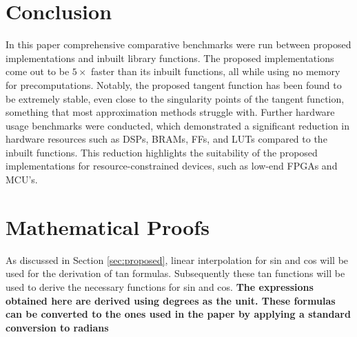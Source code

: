 \documentclass[12pt,twoside, letterpaper, margin=1in]{article}
\begin{document}
\section{Conclusion}
In this paper comprehensive comparative benchmarks were run between proposed implementations and inbuilt library functions. The proposed implementations come out to be \(5 \times\) faster than its inbuilt functions, all while using no memory for precomputations. Notably, the proposed tangent function has been found to be extremely stable, even close to the singularity points of the tangent function, something that most approximation methods struggle with.
Further hardware usage benchmarks were conducted, which demonstrated a significant reduction in hardware resources such as DSPs, BRAMs, FFs, and LUTs compared to the inbuilt functions. This reduction highlights the suitability of the proposed implementations for resource-constrained devices, such as low-end FPGAs and MCU's.








\appendix

\section{Mathematical Proofs}
\label{appendix:proofs}
As discussed in Section \ref{sec:proposed}, linear interpolation for sin and cos will be used for the derivation of tan formulas. Subsequently these tan functions will be used to derive the necessary functions for sin and cos. \textbf{The expressions obtained here are derived using degrees as the unit. These formulas can be converted to the ones used in the paper by applying a standard conversion to radians}
\end{document}
